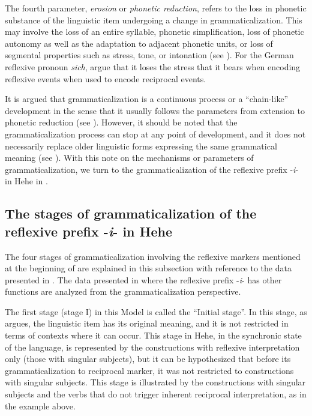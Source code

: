 \documentclass[output=paper,
            colorlinks, citecolor=brown
            ,draftmode
		  ]{langscibook}
\begin{document}
The fourth parameter, \textit{erosion} or \textit{phonetic reduction}, refers to the loss in phonetic substance of the linguistic item undergoing a change in grammaticalization. This may involve the loss of an entire syllable, phonetic simplification, loss of phonetic autonomy as well as the adaptation to adjacent phonetic units, or loss of segmental properties such as stress, tone, or intonation (see \citealt{HeineDunham2010, HeineMiyashita2008, HeineNarrog2009}). For the German reflexive pronoun \textit{sich}, \citet{HeineNarrog2009} argue that it loses the stress that it bears when encoding reflexive events when used to encode reciprocal events.

It is argued that grammaticalization is a continuous process or a ``chain-like'' development in the sense that it usually follows the parameters from extension to phonetic reduction (see \citealt{Heine2000, HeineKuteva2007, HeineNarrog2009}). However, it should be noted that the grammaticalization process can stop at any point of development, and it does not necessarily replace older linguistic forms expressing the same grammatical meaning (see \citealt{Heine2000, HeineKuteva2007, Hopper1991}). With this note on the mechanisms or parameters of grammaticalization, we turn to the grammaticalization of the reflexive prefix -\textit{i}{}- in Hehe in .

\subsection{The stages of grammaticalization of the reflexive prefix -\textit{i}{}- in Hehe}\label{sec:ngwasi:3.2}

The four stages of grammaticalization involving the reflexive markers mentioned at the beginning of  are explained in this subsection with reference to the data presented in . The data presented in  where the reflexive prefix -\textit{i}{}- has other functions are analyzed from the grammaticalization perspective.

The first stage (stage I) in this Model is called the ``Initial stage''.  In this stage, as \citet{Heine2002} argues, the linguistic item has its original meaning, and it is not restricted in terms of contexts where it can occur. This stage in Hehe, in the synchronic state of the language, is represented by the constructions with reflexive interpretation only (those with singular subjects), but it can be hypothesized that before its grammaticalization to reciprocal marker, it was not restricted to constructions with singular subjects. This stage is illustrated by the constructions with singular subjects and the verbs that do not trigger inherent reciprocal interpretation, as in the example  above.
\end{document}

